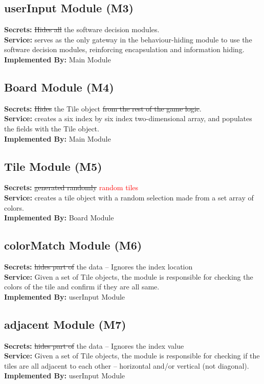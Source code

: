 \documentclass[12pt]{article}
\begin{document}
\subsection{userInput Module (M3)}
\textbf{Secrets:} \st{Hides all} the software decision modules.\\
\textbf{Service:} serves as the only gateway in the behaviour-hiding module to use the software decision modules, reinforcing encapsulation and information hiding. \\
\textbf{Implemented By:} Main Module

\subsection{Board Module (M4)}
\textbf{Secrets:} \st{Hides} the Tile object \st{from the rest of the game logic}.\\
\textbf{Service:} creates a six index by six index two-dimensional array, and populates the fields with the Tile object.\\
\textbf{Implemented By:} Main Module


\subsection{Tile Module (M5)}
\textbf{Secrets:} \st{generated randomly} \textcolor{red}{random tiles}\\
\textbf{Service:} creates a tile object with a random selection made from a set array of colors. \\
\textbf{Implemented By:} Board Module

\subsection{colorMatch Module (M6)}
\textbf{Secrets:} \st{hides part of} the data – Ignores the index location\\
\textbf{Service:} Given a set of Tile objects, the module is responsible for checking the colors of the tile and confirm if they are all same. \\
\textbf{Implemented By:} userInput Module

\subsection{adjacent Module (M7)}
\textbf{Secrets:} \st{hides part of} the data – Ignores the index value\\
\textbf{Service:} Given a set of Tile objects, the module is responsible for checking if the tiles are all adjacent to each other – horizontal and/or vertical (not diagonal).\\
\textbf{Implemented By:} userInput Module
\end{document}
